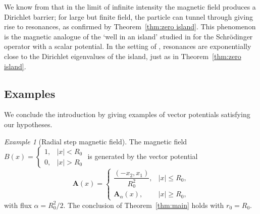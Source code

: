 \documentclass[11pt]{amsart}
\theoremstyle{remark}
\newtheorem{example}[theorem]{Example}
\newcommand{\bA}{\mathbf{A}}
\numberwithin{equation}{section}
\begin{document}
We know from \cite{HH} that in the limit of infinite intensity the magnetic field produces a Dirichlet barrier; for large but finite field,  the particle can tunnel through giving rise to resonances, as confirmed by Theorem~\ref{thm:zero island}. This phenomenon is the magnetic analogue of the `well in an island' studied in \cite[Th\'eor\`eme~9.7]{HS} for the Schr\"odinger operator with a scalar potential. In the setting of \cite{HS}, resonances are exponentially close to the Dirichlet eigenvalues of the island, just as in Theorem~\ref{thm:zero island}.

\subsection{Examples}

We conclude the introduction by  giving examples of vector potentials satisfying our hypotheses.

%
\begin{example}[Radial step magnetic field]
The magnetic field \(
B(x) = \begin{cases}
1, & |x| < R_0 \\
0, & |x| > R_0
\end{cases}
\)
 is generated by the vector potential
\[
\bA(x) = \begin{cases}
\dfrac{(-x_2, x_1)}{R_0^2}, & |x| \le R_0, \\[1em]
\bA_\alpha(x), & |x| \ge R_0,
\end{cases}
\]
with flux $\alpha=R_0^2/2$. The conclusion of Theorem~\ref{thm:main} holds with $r_0=R_0$.
\end{example}
\end{document}
